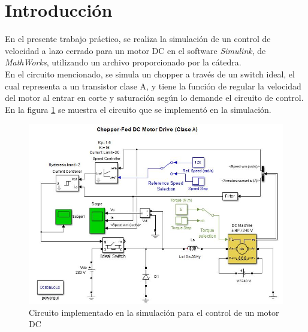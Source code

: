 \documentclass[11pt, a4paper]{article}
\begin{document}
\section{Introducción}

En el presente trabajo práctico, se realiza la simulación de un control de velocidad a lazo cerrado para un motor DC en el software \textit{Simulink}, de \textit{MathWorks}, utilizando un archivo proporcionado por la cátedra.\\
En el circuito mencionado, se simula un chopper a través de un switch ideal, el cual representa a un transistor clase A, y tiene la función de regular la velocidad del motor al entrar en corte y saturación según lo demande el circuito de control.\\

En la figura \ref{fig:circuito} se muestra el circuito que se implementó en la simulación.

\begin{figure}[H]
 \centering
 \includegraphics[scale=0.8]{imagenes/circuito.jpg}
 \caption{Circuito implementado en la simulación para el control de un motor DC}
 \label{fig:circuito}
\end{figure}
\end{document}
